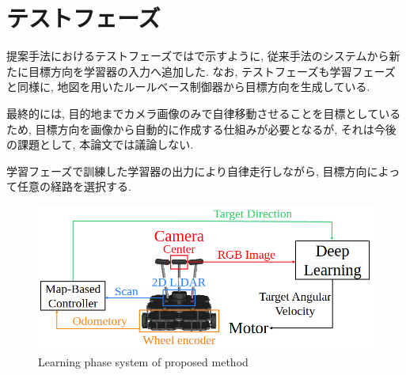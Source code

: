 
\section{テストフェーズ}
提案手法におけるテストフェーズではで示すように, 従来手法のシステムから新たに目標方向を学習器の入力へ追加した. なお, テストフェーズも学習フェーズと同様に, 地図を用いたルールベース制御器から目標方向を生成している. 
\par
最終的には, 目的地までカメラ画像のみで自律移動させることを目標としているため, 目標方向を画像から自動的に作成する仕組みが必要となるが, それは今後の課題として, 本論文では議論しない.


\par
学習フェーズで訓練した学習器の出力により自律走行しながら, 目標方向によって任意の経路を選択する.

\vspace{1cm}

\begin{figure}[hbtp]
  \centering
 \includegraphics[keepaspectratio, scale=0.46]
      {images/suggest_test_phase.png}
 \caption{Learning phase system of proposed method}
 \label{Fig:suggest_test_phase}
\end{figure}

\newpage

